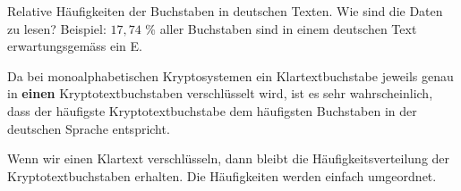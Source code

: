 \begin{table}[htb]
\centering
{}
\caption{Relative Häufigkeiten der Buchstaben in deutschen Texten. Wie sind die Daten zu lesen? Beispiel: $17,74$ \% aller Buchstaben sind in einem deutschen Text erwartungsgemäss ein E.}
\label{table-relative-haeufigkeiten}
\end{table}

Da bei monoalphabetischen Kryptosystemen ein Klartextbuchstabe jeweils genau in \textbf{einen} Kryptotextbuchstaben verschlüsselt wird, ist es sehr wahrscheinlich, dass der häufigste 
Kryptotextbuchstabe dem häufigsten Buchstaben in der deutschen Sprache entspricht. 

\begin{important}
Wenn wir einen Klartext verschlüsseln, dann bleibt die Häufigkeitsverteilung der Kryptotextbuchstaben erhalten. Die Häufigkeiten werden einfach umgeordnet.
\end{important}

